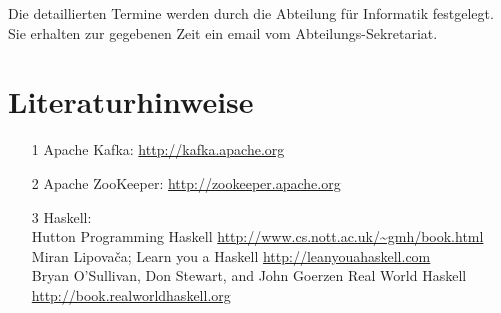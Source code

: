 Die detaillierten Termine werden durch die Abteilung für Informatik festgelegt.
Sie erhalten zur gegebenen Zeit ein email vom  Abteilungs-Sekretariat.

\section*{Literaturhinweise}
\begin{itemize}
    \item [1] Apache Kafka: \url{http://kafka.apache.org}
    \item [2] Apache ZooKeeper: \url{http://zookeeper.apache.org}
    \item [3] Haskell: \\
           Hutton Programming Haskell
           \url{http://www.cs.nott.ac.uk/~gmh/book.html}\\
            Miran Lipovača; Learn you a Haskell
            \url{http://leanyouahaskell.com} \\
            Bryan O'Sullivan, Don Stewart, and John Goerzen  Real World Haskell 
            \url{http://book.realworldhaskell.org}
\end{itemize}

